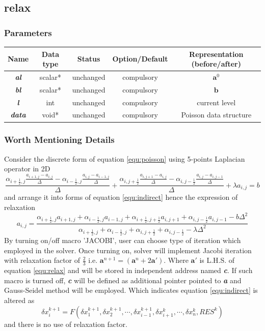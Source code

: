 \documentclass[a4paper]{article}
\newcommand{\func}[1]{\textbf{\textcolor{function}{#1}}}
\newcommand{\para}[1]{\textbf{\emph{\textcolor{para}{#1}}}}
\begin{document}
\subsection{\func{relax}}
\subsubsection{Parameters}
\begin{center}
  \begin{tabular}{|c|c|c|c|c|}
    \hline
    Name & Data type & Status & Option/Default & Representation (before/after)\\[0.5ex]
    \hline\hline
    \rowcolor{output}\para{al} & scalar* & unchanged & compulsory & $ \mathbf{a}^{0}$\\
    \hline
    \para{bl} & scalar* & unchanged & compulsory & $ \mathbf{b} $\\
    \hline
    \para{l} & int & unchanged & compulsory & current level\\
    \hline
    \para{data} & void* & unchanged & compulsory & Poisson data structure \\
    \hline
  \end{tabular}
\end{center}
\subsubsection{Worth Mentioning Details}
Consider the discrete form of equation \ref{equ:poisson} using 5-points Laplacian operator in 2D
\begin{equation}
    \frac{\alpha_{i+\frac{1}{2},j}\frac{a_{i+1,j}-a_{i,j}}{\Delta}-\alpha_{i-\frac{1}{2},j}\frac{a_{i,j}-a_{i-1,j}}{\Delta}}{\Delta}+\frac{\alpha_{i,j+\frac{1}{2}}\frac{a_{i,j+1}-a_{i,j}}{\Delta}-\alpha_{i,j-\frac{1}{2}}\frac{a_{i,j}-a_{i,j-1}}{\Delta}}{\Delta}+\lambda a_{i,j}=b
\end{equation}
and arrange it into forms of equation \ref{equ:indirect} hence the expression of relaxation
\begin{equation}\label{equ:relax}
    a_{i,j}=\frac{\alpha_{i+\frac{1}{2},j}a_{i+1,j}+\alpha_{i-\frac{1}{2},j}a_{i-1,j}+\alpha_{i+\frac{1}{2},j+\frac{1}{2}}a_{i,j+1}+\alpha_{i,j-\frac{1}{2}}a_{i,j-1}-b\Delta^2}{\alpha_{i+\frac{1}{2},j}+\alpha_{i-\frac{1}{2},j}+\alpha_{i,j+\frac{1}{2}}+\alpha_{i,j-\frac{1}{2}}-\lambda\Delta^2}
\end{equation}
By turning on/off macro 'JACOBI', user can choose type of iteration which employed in the solver. Once turning on, solver will implement Jacobi iteration with relaxation factor of $\frac{2}{3}$ i.e. $\mathbf{a}^{n+1}=(\mathbf{a}^{n}+2\mathbf{a}')$. Where $\mathbf{a}'$ is L.H.S. of equation \ref{equ:relax} and will be stored in independent address named \para{c}. If such macro is turned off, \para{c} will be defined as additional pointer pointed to \para{a} and Gauss-Seidel method will be employed. Which indicates equation \ref{equ:indirect} is altered as 
\begin{equation}
\delta x^{k+1}_i = F(\delta x^{k+1}_1,\delta x^{k+1}_2,\cdots,\delta x^{k+1}_{i-1},\delta x^k_{i+1},\cdots,\delta x_n^k, RES^k)  
\end{equation}
and there is no use of relaxation factor.
\end{document}
